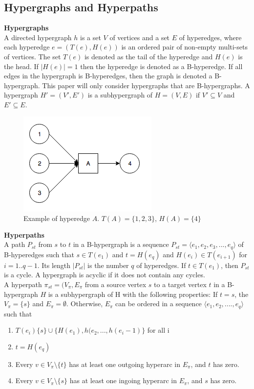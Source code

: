 \documentclass[a4paper,10pt,titlepage]{paper}
\begin{document}
\subsection{Hypergraphs and Hyperpaths}
\textbf{Hypergraphs}\\
A directed hypergraph $h$ is a set $V$ of vertices and a set $E$ of hyperedges, where each hyperedge $e=(T(e),H(e))$ is an ordered pair of non-empty multi-sets of vertices. The set $T(e)$ is denoted as the tail of the hyperedge and $H(e)$ is the head. If $|H(e)|=1$ then the hyperedge is denoted as a B-hyperedge. If all edges in the hypergraph is B-hyperedges, then the graph is denoted a B-hypergraph. This paper will only consider hypergraphs that are B-hypergraphs. A hypergraph $H' = (V',E')$ is a subhypergraph of $H=(V,E)$ if $V' \subseteq V$ and $E'\subseteq E$.\cite{Fagerberg}

\begin{figure}[H]
\centering
\includegraphics[scale=0.5]{Billeder/HyperEdge.png}
\caption{Example of hyperedge $A$. $T(A) = \{1,2,3\}$, $H(A) = \{4\}$}
\end{figure}

\textbf{Hyperpaths}\\
A path $P_{st}$ from $s$ to $t$ in a B-hypergraph is a sequence $P_{st}=\langle e_1, e_2, e_3, ... , e_q \rangle$ of B-hyperedges such that $s\in T(e_1)$ and $t=H(e_q)$ and $H(e_i) \in T(e_{i+1})$ for $i=1..q-1$. Its length $|P_{st}|$ is the number $q$ of hyperedges. If $t \in T(e_1)$, then $P_{st}$ is a cycle. A hypergraph is acyclic if it does not contain any cycles. \cite{Fagerberg} \\
A hyperpath $\pi_{st} = (V_{\pi},E_{\pi}$ from a source vertex $s$ to a target vertex $t$ in a B-hypergraph $H$ is a subhypergraph of H with the following properties: If $t = s$, the $V_{\pi}=\{s\}$ and $E_{\pi} = \emptyset$. Otherwise, $E_{\pi}$ can be ordered in a sequence $\langle e_1, e_2,....,e_q \rangle$ such that 
\begin{enumerate}
\item 
$T(e_i)\{s\} \cup \{H(e_1),h(e_2,...,h(e_i-1)\}$ for all i
\item
$t=H(e_q)$
\item
Every $v \in V_{\pi} \setminus \{t\} $ has at least one outgoing hyperarc in $E_{\pi}$, and $t$ has zero.
\item
Every $v \in V_{\pi} \setminus \{s\}$ has at least one ingoing hyperarc in $E_{\pi}$, and $s$ has zero. \cite{Fagerberg}
\end{enumerate}
\end{document}
